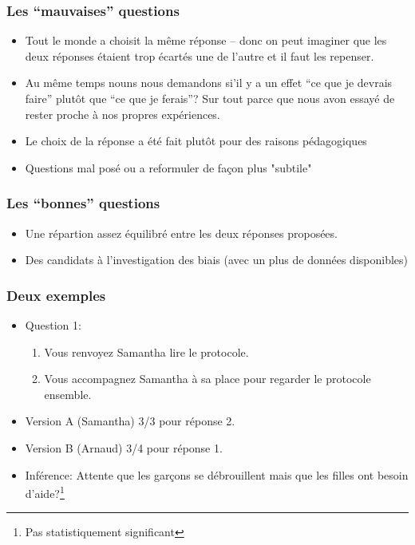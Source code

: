 \documentclass{beamer}
\begin{document}
\begin{frame}
  \frametitle{Les ``mauvaises'' questions}
  \begin{itemize}
  \item Tout le monde a choisit la même réponse -- donc on peut imaginer que les deux réponses étaient
  trop écartés une de l'autre et il faut les repenser.
  \item Au même temps nouns nous demandons si'il y a un effet ``ce que je devrais faire'' plutôt que ``ce que 
  je ferais''? Sur tout parce que nous avon essayé de rester proche à nos propres expériences.
 \item Le choix de la réponse a été fait plutôt  pour des raisons pédagogiques  
 \item Questions mal posé ou a reformuler de façon plus "subtile"
\end{itemize}
\end{frame}

\begin{frame}
  \frametitle{Les ``bonnes'' questions}
  \begin{itemize}
  \item Une répartion assez équilibré entre les deux réponses proposées.
  \item  Des candidats à l'investigation des biais (avec un plus de données disponibles)
  \end{itemize}
\end{frame}

\begin{frame}
  \frametitle{Deux exemples}
  \begin{itemize}
  \item Question 1:
    \begin{enumerate}
    \item Vous renvoyez Samantha lire le protocole. 
    \item Vous accompagnez Samantha à sa place pour regarder le protocole ensemble. 
    \end{enumerate}
  \item Version A (Samantha) 3/3 pour réponse 2.
  \item Version B (Arnaud) 3/4 pour réponse 1.
  \item Inférence: Attente que les garçons se débrouillent mais que les filles ont
    besoin d'aide?\footnote{Pas statistiquement significant} 
  \end{itemize}
\end{frame}
\end{document}
